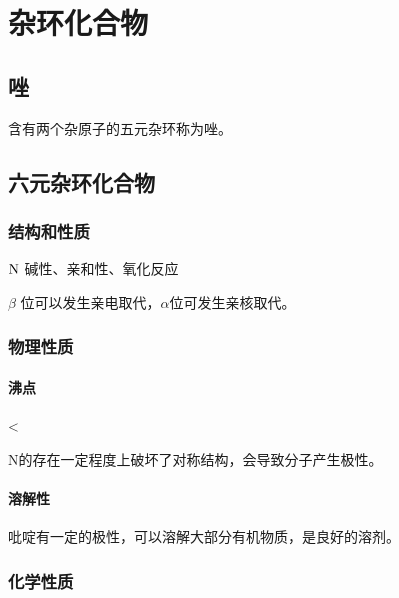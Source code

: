 \chapter{杂环化合物}



\section{唑}

含有两个杂原子的五元杂环称为唑。


\section{六元杂环化合物}

\subsection{结构和性质}

\begin{center}
\end{center}

$\ce{N}$ 碱性、亲和性、氧化反应

$\beta$ 位可以发生亲电取代，$\alpha$位可发生亲核取代。

\subsection{物理性质}

\subsubsection{沸点}

\begin{center}
     < 
\end{center}

N的存在一定程度上破坏了对称结构，会导致分子产生极性。

\subsubsection{溶解性}

吡啶有一定的极性，可以溶解大部分有机物质，是良好的溶剂。

\subsection{化学性质}

